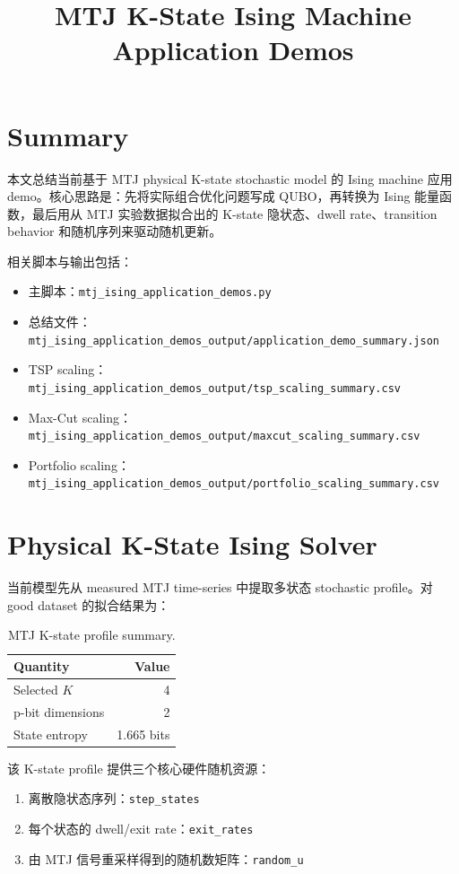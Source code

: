 \documentclass[UTF8]{ctexart}
\title{MTJ K-State Ising Machine Application Demos}
\author{}
\date{}
\begin{document}
\maketitle

\section*{Summary}

本文总结当前基于 MTJ physical K-state stochastic model 的 Ising machine 应用 demo。核心思路是：先将实际组合优化问题写成 QUBO，再转换为 Ising 能量函数，最后用从 MTJ 实验数据拟合出的 K-state 隐状态、dwell rate、transition behavior 和随机序列来驱动随机更新。

相关脚本与输出包括：
\begin{itemize}[leftmargin=2em]
    \item 主脚本：\texttt{mtj\_ising\_application\_demos.py}
    \item 总结文件：\texttt{mtj\_ising\_application\_demos\_output/application\_demo\_summary.json}
    \item TSP scaling：\texttt{mtj\_ising\_application\_demos\_output/tsp\_scaling\_summary.csv}
    \item Max-Cut scaling：\texttt{mtj\_ising\_application\_demos\_output/maxcut\_scaling\_summary.csv}
    \item Portfolio scaling：\texttt{mtj\_ising\_application\_demos\_output/portfolio\_scaling\_summary.csv}
\end{itemize}

\section{Physical K-State Ising Solver}

当前模型先从 measured MTJ time-series 中提取多状态 stochastic profile。对 good dataset 的拟合结果为：

\begin{table}[H]
\centering
\begin{tabular}{lr}
\toprule
Quantity & Value \\
\midrule
Selected $K$ & 4 \\
p-bit dimensions & 2 \\
State entropy & 1.665 bits \\
\bottomrule
\end{tabular}
\caption{MTJ K-state profile summary.}
\end{table}

该 K-state profile 提供三个核心硬件随机资源：
\begin{enumerate}[leftmargin=2em]
    \item 离散隐状态序列：\texttt{step\_states}
    \item 每个状态的 dwell/exit rate：\texttt{exit\_rates}
    \item 由 MTJ 信号重采样得到的随机数矩阵：\texttt{random\_u}
\end{enumerate}
\end{document}
